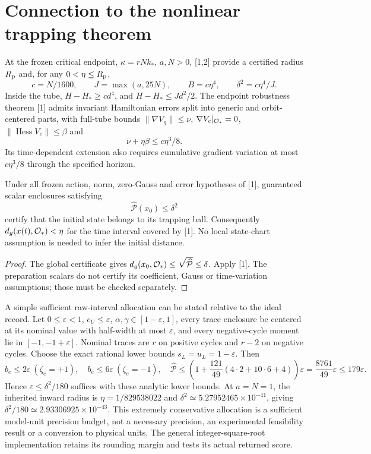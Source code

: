 \documentclass[11pt,a4paper]{article}
\begin{document}
\section{Connection to the nonlinear trapping theorem}
At the frozen critical endpoint, $\kappa=rNk_*$, $a,N>0$, [1,2] provide a certified radius $R_{\rm p}$ and, for any $0<\eta\le R_{\rm p}$,
\[
c=N/1600,\qquad J=\max(a,25N),\qquad B=c\eta^4,
\qquad \delta^2=c\eta^4/J.
\]
Inside the tube, $H-H_*\ge c d^4$, and $H-H_*\le Jd^2/2$. The endpoint robustness theorem [1] admits invariant Hamiltonian errors split into generic and orbit-centered parts, with full-tube bounds $\|\nabla V_g\|\le\nu$, $\nabla V_c|_{\mathcal O_*}=0$, $\|\operatorname{Hess}V_c\|\le\beta$ and
\[
\nu+\eta\beta\le c\eta^3/8.
\]
Its time-dependent extension also requires cumulative gradient variation at most $c\eta^3/8$ through the specified horizon.
\begin{corollary}
Under all frozen action, norm, zero-Gauss and error hypotheses of [1], guaranteed scalar enclosures satisfying
\[
\widehat{\mathcal P}(x_0)\le\delta^2
\]
certify that the initial state belongs to its trapping ball. Consequently $d_g(x(t),\mathcal O_*)<\eta$ for the time interval covered by [1]. No local state-chart assumption is needed to infer the initial distance.
\end{corollary}
\begin{proof}
The global certificate gives $d_g(x_0,\mathcal O_*)\le\sqrt{\widehat{\mathcal P}}\le\delta$. Apply [1]. The preparation scalars do not certify its coefficient, Gauss or time-variation assumptions; those must be checked separately.
\end{proof}
A simple sufficient raw-interval allocation can be stated relative to the ideal record. Let $0\le\varepsilon<1$, $e_U\le\varepsilon$, $\alpha,\gamma\in[1-\varepsilon,1]$, every trace enclosure be centered at its nominal value with half-width at most $\varepsilon$, and every negative-cycle moment lie in $[-1,-1+\varepsilon]$. Nominal traces are $r$ on positive cycles and $r-2$ on negative cycles. Choose the exact rational lower bounds $s_L=u_L=1-\varepsilon$. Then
\[
b_e\le2\varepsilon\ (\zeta_e=+1),\quad
b_e\le6\varepsilon\ (\zeta_e=-1),\quad
\widehat{\mathcal P}\le\left(1+\frac{121}{49}(4\cdot2+10\cdot6+4)\right)\varepsilon
=\frac{8761}{49}\varepsilon\le179\varepsilon.
\]
Hence $\varepsilon\le\delta^2/180$ suffices with these analytic lower bounds. At $a=N=1$, the inherited inward radius is $\eta=1/829538022$ and $\delta^2\simeq5.27952465\times10^{-41}$, giving $\delta^2/180\simeq2.93306925\times10^{-43}$. This extremely conservative allocation is a sufficient model-unit precision budget, not a necessary precision, an experimental feasibility result or a conversion to physical units. The general integer-square-root implementation retains its rounding margin and tests its actual returned score.
\newpage
\end{document}
